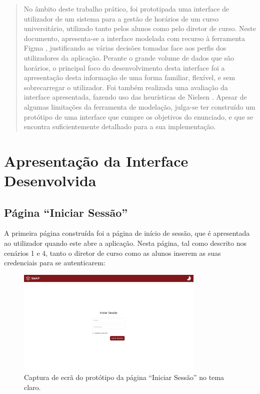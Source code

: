 \documentclass[12pt, a4paper]{article}
\begin{document}
\begin{abstract}
    \noindent
    No âmbito deste trabalho prático, foi prototipada uma interface de utilizador de um sistema para
    a gestão de horários de um curso universitário, utilizado tanto pelos alunos como pelo diretor
    de curso. Neste documento, apresenta-se a interface modelada com recurso à ferramenta Figma
    \cite{figma}, justificando as várias decisões tomadas face aos perfis dos utilizadores da
    aplicação. Perante o grande volume de dados que são horários, o principal foco do
    desenvolvimento desta interface foi a apresentação desta informação de uma forma familiar,
    flexível, e sem sobrecarregar o utilizador. Foi também realizada uma avaliação da interface
    apresentada, fazendo uso das heurísticas de Nielsen \cite{nielsen}. Apesar de algumas limitações
    da ferramenta de modelação, julga-se ter construído um protótipo de uma interface que cumpre os
    objetivos do enunciado, e que se encontra suficientemente detalhado para a sua implementação.
\end{abstract}

\section{Apresentação da Interface Desenvolvida}

\subsection{Página ``Iniciar Sessão''}

A primeira página construída foi a página de início de sessão, que é apresentada ao utilizador
quando este abre a aplicação. Nesta página, tal como descrito nos cenários 1 e 4, tanto o diretor
de curso como as alunos inserem as suas credenciais para se autenticarem:

\begin{figure}[H]
    \centering
    \includegraphics[width=0.8\textwidth]{res/prototype/iniciar-sessao.png}
    \caption{Captura de ecrã do protótipo da página ``Iniciar Sessão'' no tema claro.}
    \label{iniciar-sessao}
\end{figure}
\end{document}
